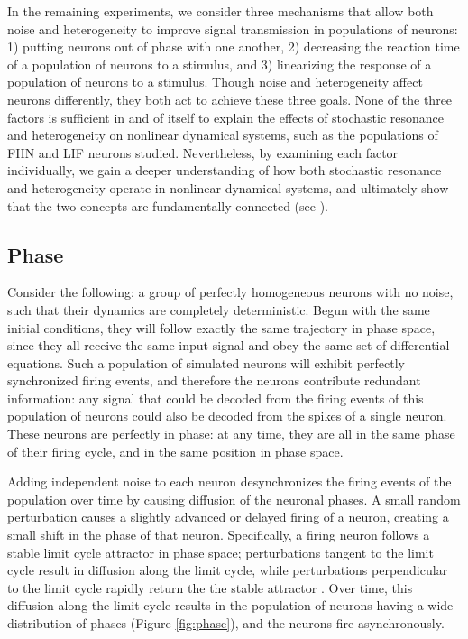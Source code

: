 \documentclass[12pt]{article}
\newcommand{\fig}[1]{Figure \ref{fig:#1}}
\newcommand{\scn}[1]{\textsc{\nameref{scn:#1}}}
\newcommand{\scnlabel}[1]{\label{scn:#1}}
\begin{document}
In the remaining experiments, we consider three mechanisms that allow both noise and heterogeneity to improve signal transmission in populations of neurons: 1) putting neurons out of phase with one another, 2) decreasing the reaction time of a population of neurons to a stimulus, and 3) linearizing the response of a population of neurons to a stimulus. Though noise and heterogeneity affect neurons differently, they both act to achieve these three goals. None of the three factors is sufficient in and of itself to explain the effects of stochastic resonance and heterogeneity on nonlinear dynamical systems, such as the populations of FHN and LIF neurons studied. Nevertheless, by examining each factor individually, we gain a deeper understanding of how both stochastic resonance and heterogeneity operate in nonlinear dynamical systems, and ultimately show that the two concepts are fundamentally connected (see \scn{discussion}).

\subsection{Phase}
\scnlabel{phase}

Consider the following: a group of perfectly homogeneous neurons with no noise, such that their dynamics are completely deterministic. Begun with the same initial conditions, they will follow exactly the same trajectory in phase space, since they all receive the same input signal and obey the same set of differential equations. Such a population of simulated neurons will exhibit perfectly synchronized firing events, and therefore the neurons contribute redundant information: any signal that could be decoded from the firing events of this population of neurons could also be decoded from the spikes of a single neuron. These neurons are perfectly in phase: at any time, they are all in the same phase of their firing cycle, and in the same position in phase space.

Adding independent noise to each neuron desynchronizes the firing events of the population over time by causing diffusion of the neuronal phases. A small random perturbation causes a slightly advanced or delayed firing of a neuron, creating a small shift in the phase of that neuron. Specifically, a firing neuron follows a stable limit cycle attractor in phase space; perturbations tangent to the limit cycle result in diffusion along the limit cycle, while perturbations perpendicular to the limit cycle rapidly return the the stable attractor \citep{Tomita1974}. Over time, this diffusion along the limit cycle results in the population of neurons having a wide distribution of phases (\fig{phase}), and the neurons fire asynchronously. 
\end{document}
